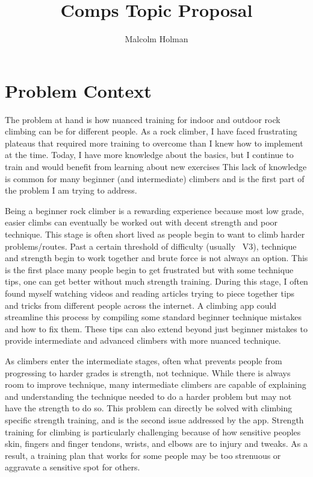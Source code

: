 \documentclass[10pt,twocolumn]{article}
\title{Comps Topic Proposal}
\author{Malcolm Holman}
\affiliation{Occidental College}
\begin{document}
\maketitle

\section{Problem Context}

    The problem at hand is how nuanced training for indoor and outdoor rock climbing can be for different people. As a rock climber, I have faced frustrating plateaus that required more training to overcome than I knew how to implement at the time. Today, I have more knowledge about the basics, but I continue to train and would benefit from learning about new exercises This lack of knowledge is common for many beginner (and intermediate) climbers and is the first part of the problem I am trying to address. 

	Being a beginner rock climber is a rewarding experience because most low grade, easier climbs can eventually be worked out with decent strength and poor technique. This stage is often short lived as people begin to want to climb harder problems/routes. Past a certain threshold of difficulty (usually ~V3), technique and strength begin to work together and brute force is not always an option. This is the first place many people begin to get frustrated but with some technique tips, one can get better without much strength training. During this stage, I often found myself watching videos and reading articles trying to piece together tips and tricks from different people across the internet. A climbing app could streamline this process by compiling some standard beginner technique mistakes and how to fix them. These tips can also extend beyond just beginner mistakes to provide intermediate and advanced climbers with more nuanced technique. 

	As climbers enter the intermediate stages, often what prevents people from progressing to harder grades is strength, not technique. While there is always room to improve technique, many intermediate climbers are capable of explaining and understanding the technique needed to do a harder problem but may not have the strength to do so. This problem can directly be solved with climbing specific strength training, and is the second issue addressed by the app. Strength training for climbing is particularly challenging because of how sensitive peoples skin, fingers and finger tendons, wrists, and elbows are to injury and tweaks. As a result, a training plan that works for some people may be too strenuous or aggravate a sensitive spot for others. 
	
\end{document}
